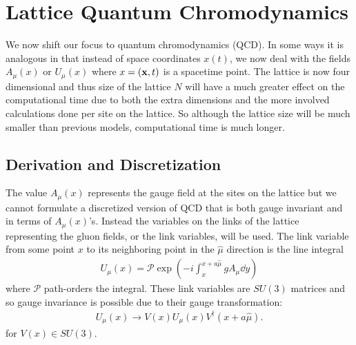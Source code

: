 \documentclass[11pt]{article}
\begin{document}
\section{Lattice Quantum Chromodynamics}
We now shift our focus to quantum chromodynamics (QCD). In some ways it is analogous in that instead of space coordinates $x(t)$, we now deal with the fields $A_\mu(x)$ or $U_\mu(x)$ where $x=(\vb{x},t)$ is a spacetime point. The lattice is now four dimensional and thus size of the lattice $N$ will have a much greater effect on the computational time due to both the extra dimensions and the more involved calculations done per site on the lattice. So although the lattice size will be much smaller than previous models, computational time is much longer.

\subsection{Derivation and Discretization}
The value $A_\mu(x)$ represents the gauge field at the sites on the lattice but we cannot formulate a discretized version of QCD that is both gauge invariant and in terms of $A_\mu(x)$'s. Instead the variables on the links of the lattice representing the gluon fields, or the link variables, will be used. The link variable from some point $x$ to its neighboring point in the $\hat{\mu}$ direction is the line integral
\begin{align}
	U_\mu(x)=\mathcal{P}\exp\left(-i\int_x^{x+a\hat{\mu}}gA_\mu\dd{y}\right)
\end{align}
where $\mathcal{P}$ path-orders the integral. These link variables are $SU(3)$ matrices and so gauge invariance is possible due to their gauge transformation:
\begin{align}
	U_\mu(x)\to V(x)U_\mu(x)V^\dagger(x+a\hat{\mu}).
\end{align}
for $V(x)\in SU(3)$.
\end{document}
